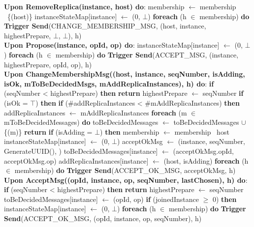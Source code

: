 \documentclass[sigconf]{acmart}
\begin{document}
\begin{algorithmic}[1]
\State \textbf{Upon RemoveReplica(instance, host) do}:
\State \quad membership $\gets$ membership \ \{(host)\}
\State \quad instanceStateMap[instance] $\gets$ (0, $\bot$)
\State \quad \textbf{foreach} (h $\in$ membership) \textbf{do}
\State \quad \quad \textbf{Trigger Send}(CHANGE\_MEMBERSHIP\_MSG, (host, instance, highestPrepare, $\bot$, $\bot$), h) \\

\State \textbf{Upon Propose(instance, opId, op) do}:
\State \quad instanceStateMap[instance] $\gets$ (0, $\bot$)
\State \quad \textbf{foreach} (h $\in$ membership) \textbf{do}
\State \quad \quad \textbf{Trigger Send}(ACCEPT\_MSG, (instance, highestPrepare, opId, op), h) \\

\State \textbf{Upon ChangeMembershipMsg((host, instance, seqNumber, isAdding, isOk, mToBeDecidedMsgs, mAddReplicaInstances), h) do}:
\State \quad \textbf{if} (seqNumber < highestPrepare) \textbf{then}
\State \quad \quad \textbf{return}
\State \quad highestPrepare $\gets$ seqNumber
\State \quad \textbf{if} (isOk = $\top$) \textbf{then}
\State \quad \quad \textbf{if} (\#addReplicaInstances < \#mAddReplicaInstances) \textbf{then}
\State \quad \quad \quad addReplicaInstances $\gets$ mAddReplicaInstances 
\State \quad \quad \textbf{foreach} (m $\in$ mToBeDecidedMessages) \textbf{do}
\State \quad \quad \quad toBeDecidedMessages $\gets$ toBeDecidedMessages $\cup$ \{(m)\}
\State \quad \quad \textbf{return}
\State \quad \textbf{if} (isAdding = $\bot$) \textbf{then}
\State \quad \quad membership $\gets$ membership \ host
\State \quad instanceStateMap[instance] $\gets$ (0, $\bot$)
\State \quad acceptOkMsg $\gets$ (instance, seqNumber, GenerateUUID(), {})
\State \quad toBeDecidedMessages[instance] $\gets$ (acceptOkMsg.opId, acceptOkMsg.op)
\State \quad addReplicaInstances[instance] $\gets$ (host, isAdding)
\State \quad \textbf{foreach} (h $\in$ membership) \textbf{do}
\State \quad \quad \textbf{Trigger Send}(ACCEPT\_OK\_MSG, acceptOkMsg, h) \\

\State \textbf{Upon AcceptMsg((opId, instance, op, seqNumber, lastChosen), h) do}:
\State \quad \textbf{if} (seqNumber < highestPrepare) \textbf{then}
\State \quad \quad \textbf{return}
\State \quad highestPrepare $\gets$ seqNumber
\State \quad toBeDecidedMessages[instance] $\gets$ (opId, op)
\State \quad \textbf{if} (joinedInstance $\ge$ 0) \textbf{then}
\State \quad \quad instanceStateMap[instance] $\gets$ (0, $\bot$)
\State \quad \quad \textbf{foreach} (h $\in$ membership) \textbf{do}
\State \quad \quad \quad \textbf{Trigger Send}(ACCEPT\_OK\_MSG, (opId, instance, op, seqNumber), h) \\


\end{algorithmic}
\end{document}
